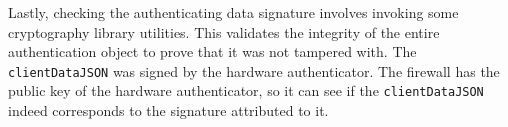 Lastly, checking the authenticating data signature involves invoking some cryptography library utilities. This validates the integrity of the entire authentication object to prove that it was not tampered with. The \lstinline{clientDataJSON} was signed by the hardware authenticator. The firewall has the public key of the hardware authenticator, so it can see if the \lstinline{clientDataJSON} indeed corresponds to the signature attributed to it.







